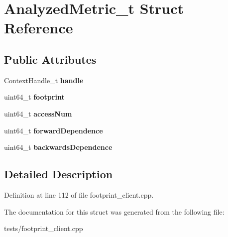 \hypertarget{structAnalyzedMetric__t}{\section{Analyzed\-Metric\-\_\-t Struct Reference}
\label{structAnalyzedMetric__t}
}
\subsection*{Public Attributes}
\begin{DoxyCompactItemize}
\item 
\hypertarget{structAnalyzedMetric__t_a0e5bb3b1a0acca0ab19967bfe63ab292}{Context\-Handle\-\_\-t {\bfseries handle}}\label{structAnalyzedMetric__t_a0e5bb3b1a0acca0ab19967bfe63ab292}

\item 
\hypertarget{structAnalyzedMetric__t_af41c68b92f8f0eeb1a1ba62ecdc320be}{uint64\-\_\-t {\bfseries footprint}}\label{structAnalyzedMetric__t_af41c68b92f8f0eeb1a1ba62ecdc320be}

\item 
\hypertarget{structAnalyzedMetric__t_a2344719c741fb29d23d3e0a83c38c28e}{uint64\-\_\-t {\bfseries access\-Num}}\label{structAnalyzedMetric__t_a2344719c741fb29d23d3e0a83c38c28e}

\item 
\hypertarget{structAnalyzedMetric__t_aef76a0d032415d7d209b6f66591ceb09}{uint64\-\_\-t {\bfseries forward\-Dependence}}\label{structAnalyzedMetric__t_aef76a0d032415d7d209b6f66591ceb09}

\item 
\hypertarget{structAnalyzedMetric__t_a5b6cd1b89febfbc46249e45d123b2eec}{uint64\-\_\-t {\bfseries backwards\-Dependence}}\label{structAnalyzedMetric__t_a5b6cd1b89febfbc46249e45d123b2eec}

\end{DoxyCompactItemize}


\subsection{Detailed Description}


Definition at line 112 of file footprint\-\_\-client.\-cpp.



The documentation for this struct was generated from the following file\-:\begin{DoxyCompactItemize}
\item 
tests/footprint\-\_\-client.\-cpp\end{DoxyCompactItemize}
